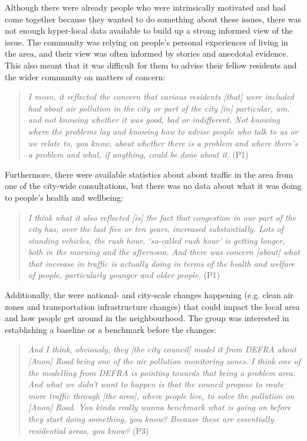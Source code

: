 Although there were already people who were intrinsically motivated and had come together because they wanted to do something about these issues, there was not enough hyper-local data available to build up a strong informed view of the issue. The community was relying on people's personal experiences of living in the area, and their view was often informed by stories and anecdotal evidence. This also meant that it was difficult for them to advise their fellow residents and the wider community on matters of concern:
\begin{quote}
    \textit{I mean, it reflected the concern that various residents [that] were included had about air pollution in the city or part of the city [in] particular, um, and not knowing whether it was good, bad or indifferent. Not knowing where the problems lay and knowing how to advise people who talk to us or we relate to, you know, about whether there is a problem and where there's a problem and what, if anything, could be done about it.} (P1)
\end{quote}

Furthermore, there were available statistics about about traffic in the area from one of the city-wide consultations, but there was no data about what it was doing to people's health and wellbeing:
\begin{quote}
    \textit{I think what it also reflected [is] the fact that congestion in our part of the city has, over the last five or ten years, increased substantially. Lots of standing vehicles, the rush hour, `so-called rush hour' is getting longer, both in the morning and the afternoon. And there was concern [about] what that increase in traffic is actually doing in terms of the health and welfare of people, particularly younger and older people.} (P1)
\end{quote}
Additionally, the were national- and city-scale changes happening (e.g. clean air zones and transportation infrastructure changes) that could impact the local area and how people get around in the neighbourhood. The group was interested in establishing a baseline or a benchmark before the changes:
\begin{quote}
    \textit{And I think, obviously, they [the city council] model it from DEFRA about [Anon] Road being one of the air pollution monitoring zones. I think one of the modelling from DEFRA is pointing towards that being a problem area. And what we didn't want to happen is that the council propose to route more traffic through [the area], where people live, to solve the pollution on [Anon] Road. You kinda really wanna benchmark what is going on before they start doing something, you know? Because these are essentially residential areas, you know?} (P3)
\end{quote}

